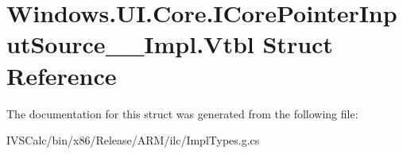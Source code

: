 \hypertarget{struct_windows_1_1_u_i_1_1_core_1_1_i_core_pointer_input_source_____impl_1_1_vtbl}{}\section{Windows.\+U\+I.\+Core.\+I\+Core\+Pointer\+Input\+Source\+\_\+\+\_\+\+Impl.\+Vtbl Struct Reference}
\label{struct_windows_1_1_u_i_1_1_core_1_1_i_core_pointer_input_source_____impl_1_1_vtbl}


The documentation for this struct was generated from the following file\+:\begin{DoxyCompactItemize}
\item 
I\+V\+S\+Calc/bin/x86/\+Release/\+A\+R\+M/ilc/Impl\+Types.\+g.\+cs\end{DoxyCompactItemize}

